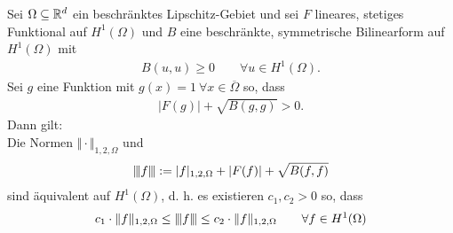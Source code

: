 \begin{proposition}\label{prop1.11}
	Sei $\Omega\subseteq\mathbb{R}^d$ ein beschränktes Lipschitz-Gebiet und sei $F$ lineares, stetiges Funktional auf $H^1(\Omega)$ und $B$ eine beschränkte, symmetrische Bilinearform auf $H^1(\Omega)$ mit
	\begin{align*}
		B(u,u)\geq0\qquad\forall u\in H^1(\Omega).
	\end{align*}
	Sei $g$ eine Funktion mit $g(x)=1~\forall x\in\overline{\Omega}$ so, dass
	\begin{align*}
		|F(g)|+\sqrt{B(g,g)}>0.
	\end{align*}
	Dann gilt:\\
	Die Normen $\Vert\cdot\Vert_{1,2,\Omega}$ und
	\begin{align*}
		{\left\vert\kern-0.25ex\left\vert\kern-0.25ex\left\vert f \right\vert\kern-0.25ex\right\vert\kern-0.25ex\right\vert}:=|f|_{1,2,\Omega}+|F(f)|+\sqrt{B(f,f)}
	\end{align*}
	sind äquivalent auf $H^1(\Omega)$, d. h. es existieren $c_1,c_2>0$ so, dass
	\begin{align*}
		c_1\cdot\Vert f\Vert_{1,2,\Omega}\leq{\left\vert\kern-0.25ex\left\vert\kern-0.25ex\left\vert f \right\vert\kern-0.25ex\right\vert\kern-0.25ex\right\vert}
		\leq
		c_2\cdot\Vert f\Vert_{1,2,\Omega}
		\qquad\forall f\in H^1(\Omega)
	\end{align*}
\end{proposition}

